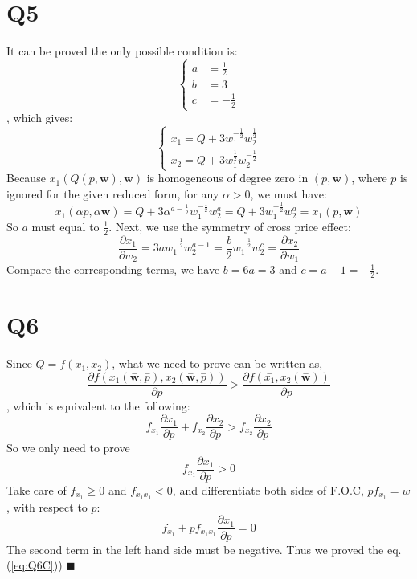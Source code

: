 \documentclass{article}
\begin{document}
\section*{Q5}
It can be proved the only possible condition is:
\begin{equation}
	\begin{cases}
		a &= \frac{1}{2}\\
		b &= 3 \\
		c &= -\frac{1}{2}	
	\end{cases}
\end{equation}
, which gives:
\begin{equation}
	\begin{cases}
		x_1 = Q + 3w^{-\frac{1}{2}}_1 w^{\frac{1}{2}}_2		\\
		x_2 = Q + 3w^{\frac{1}{2}}_1 w^{-\frac{1}{2}}_2	
	\end{cases}
\end{equation}
Because $x_1 (Q(p,\bm{w}), \bm{w})$ is homogeneous of degree zero in $(p,\bm{w})$, where $p$ is ignored for the given reduced form, for any $\alpha >0$, we must have:
\begin{equation}
	x_1(\alpha p, \alpha \bm{w}) = Q + 3\alpha ^ {a-\frac{1}{2}} w^{-\frac{1}{2}}_1 w^{a}_2	 = Q + 3w^{-\frac{1}{2}}_1 w^{a}_2 = x_1(p, \bm{w})  
\end{equation}
So $a$ must equal to $\frac{1}{2}$. Next, we use the symmetry of cross price effect:
\begin{equation}
 	\frac{\partial x_1}{\partial w_2} = 3aw^{-\frac{1}{2}}_1 w_2^{a-1} = \frac{b}{2} w^{-\frac{1}{2}}_1 w_2^{c} = \frac{\partial x_2}{\partial w_1}
 \end{equation} 
 Compare the corresponding terms, we have $b = 6a =3 $ and $c=a-1=-\frac{1}{2}$.\quad{$\blacksquare$}


\section*{Q6}
Since $Q = f(x_1,x_2)$, what we need to prove can be written as,
\begin{equation}
	\frac{\partial f(x_1(\overset{-}{\bm{w}},\overset{-}{p}),x_2(\overset{-}{\bm{w}},\overset{-}{p}))}{\partial p} > 
	\frac{\partial f(\overset{-}{x_1}, x_2(\overset{-}{\bm{w}}))}
	{\partial p}
	\end{equation}
, which is equivalent to the following:
\begin{equation}
	f_{x_1}\frac{\partial x_1}{\partial p} +f_{x_2}\frac{\partial x_2}{\partial p}
	> f_{x_2}\frac{\partial x_2}{\partial p}
\end{equation}
So we only need to prove 
\begin{equation}\label{eq:Q6C}
	f_{x_1}\frac{\partial x_1}{\partial p} > 0 
\end{equation}
Take care of $f_{x_1}\geq0$ and $f_{x_1 x_1}<0$, and differentiate both sides of F.O.C, $pf_{x_1} = w$, with respect to $p$:
\begin{equation}
	f_{x_1} + pf_{x_1 x_1} \frac{\partial x_1}{\partial p} = 0
\end{equation}
The second term in the left hand side must be negative. Thus we proved the eq.(\ref{eq:Q6C})) $\blacksquare$

% 
\end{document}

